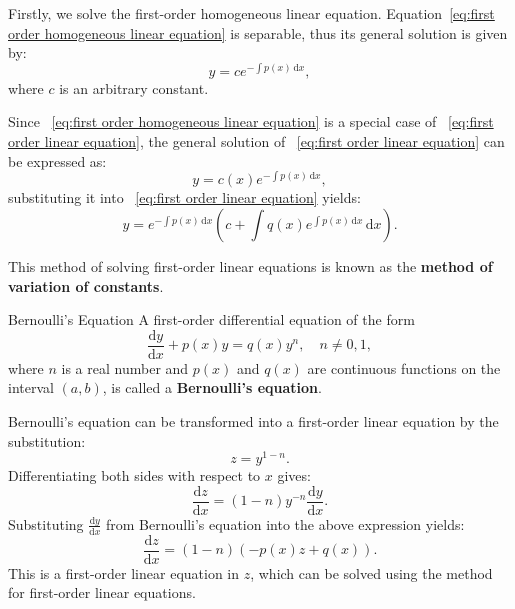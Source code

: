 \documentclass[11pt]{../../TexTemplate/elegantbook}
\begin{document}
Firstly, we solve the first-order homogeneous linear equation.
Equation~\ref{eq:first order homogeneous linear equation} is separable, 
thus its general solution is given by:
\[
y = ce^{-\int p(x) \, \mathrm{d}x},
\]
where \(c\) is an arbitrary constant.

Since ~\ref{eq:first order homogeneous linear equation} is a special case of ~\ref{eq:first order linear equation},
the general solution of ~\ref{eq:first order linear equation} can be expressed as:
\[
y = c(x) e^{-\int p(x) \, \mathrm{d}x},
\]
substituting it into ~\ref{eq:first order linear equation} yields:
\[
y = e^{-\int p(x) \, \mathrm{d}x} \left( c + \int q(x) e^{\int p(x) \, \mathrm{d}x} \, \mathrm{d}x \right).
\]

This method of solving first-order linear equations is known as the \textbf{method of variation of constants}.


\begin{definition}{Bernoulli's Equation}
    A first-order differential equation of the form
    \begin{equation*}
        \frac{\mathrm{d}y}{\mathrm{d}x} + p(x) y = q(x) y^n,\quad n \neq 0, 1,
    \end{equation*}
    where \(n\) is a real number and \(p(x)\) and \(q(x)\) are continuous functions on the interval \((a, b)\), 
    is called a \textbf{Bernoulli's equation}.
\end{definition}
Bernoulli's equation can be transformed into a first-order linear equation by the substitution:
\[z = y^{1-n}.\]
Differentiating both sides with respect to \(x\) gives:
\[\frac{\mathrm{d}z}{\mathrm{d}x} = (1-n) y^{-n} \frac{\mathrm{d}y}{\mathrm{d}x}.\]
Substituting \(\frac{\mathrm{d}y}{\mathrm{d}x}\) from Bernoulli's equation into the above expression yields:
\[\frac{\mathrm{d}z}{\mathrm{d}x} = (1-n) \left( -p(x) z + q(x) \right).\]
This is a first-order linear equation in \(z\), which can be solved using the method for first-order linear equations.
\end{document}
